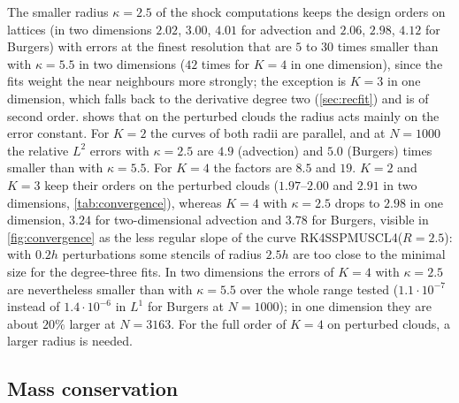 \documentclass[smallextended]{svjour3}
\numberwithin{equation}{section}
\begin{document}
The smaller radius $\kappa=2.5$ of the shock computations keeps the design orders on lattices (in two dimensions $2.02$, $3.00$, $4.01$ for advection and $2.06$, $2.98$, $4.12$ for Burgers) with errors at the finest resolution that are $5$ to $30$ times smaller than with $\kappa=5.5$ in two dimensions ($42$ times for $K=4$ in one dimension), since the fits weight the near neighbours more strongly; the exception is $K=3$ in one dimension, which falls back to the derivative degree two (\cref{sec:recfit}) and is of second order.  shows that on the perturbed clouds the radius acts mainly on the error constant. For $K=2$ the curves of both radii are parallel, and at $N=1000$ the relative $L^2$ errors with $\kappa=2.5$ are $4.9$ (advection) and $5.0$ (Burgers) times smaller than with $\kappa=5.5$. For $K=4$ the factors are $8.5$ and $19$. $K=2$ and $K=3$ keep their orders on the perturbed clouds ($1.97$--$2.00$ and $2.91$ in two dimensions, \cref{tab:convergence}), whereas $K=4$ with $\kappa=2.5$ drops to $2.98$ in one dimension, $3.24$ for two-dimensional advection and $3.78$ for Burgers, visible in \cref{fig:convergence} as the less regular slope of the curve RK4SSPMUSCL4($R=2.5$): with $0.2h$ perturbations some stencils of radius $2.5h$ are too close to the minimal size for the degree-three fits. In two dimensions the errors of $K=4$ with $\kappa=2.5$ are nevertheless smaller than with $\kappa=5.5$ over the whole range tested ($1.1\cdot10^{-7}$ instead of $1.4\cdot10^{-6}$ in $L^1$ for Burgers at $N=1000$); in one dimension they are about $20\%$ larger at $N=3163$. For the full order of $K=4$ on perturbed clouds, a larger radius is needed.

\subsection{Mass conservation}\label{sec:mass}
\end{document}

